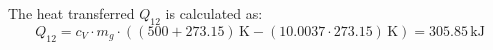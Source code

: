 The heat transferred \( Q_{12} \) is calculated as:  
\[
Q_{12} = c_V \cdot m_g \cdot \left( (500 + 273.15) \, \text{K} - (10.0037 \cdot 273.15) \, \text{K} \right) = 305.85 \, \text{kJ}
\]
